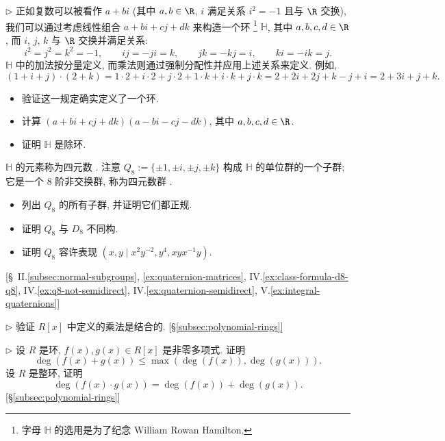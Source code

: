 \begin{prob}
\label{ex:quaternions}
$\triangleright$ 正如复数可以被看作 $a + bi$ (其中 $a, b \in \R$, $i$ 满足关系 $i^2 = -1$ 且与 $\R$ 交换), 我们可以通过考虑线性组合 $a + bi + cj + dk$ 来构造一个环%
\footnote{字母 $\mathbb{H}$ 的选用是为了纪念 William Rowan Hamilton.}%
$\mathbb{H}$, 其中 $a, b, c, d \in \R$, 而 $i$, $j$, $k$ 与 $\R$ 交换并满足关系:
\[
i^2 = j^2 = k^2 = -1, \qquad ij = -ji = k, \qquad jk = -kj = i, \qquad ki = -ik = j.
\]
$\mathbb{H}$ 中的加法按分量定义, 而乘法则通过强制分配性并应用上述关系来定义. 例如,
\[
(1 + i + j) \cdot (2 + k) = 1 \cdot 2 + i \cdot 2 + j \cdot 2 + 1 \cdot k + i \cdot k + j \cdot k = 2 + 2i + 2j + k - j + i = 2 + 3i + j + k.
\]
\begin{itemize}
	\item[(i)] 验证这一规定确实定义了一个环.
	\item[(ii)] 计算 $(a + bi + cj + dk)(a - bi - cj - dk)$, 其中 $a, b, c, d \in \R$.
	\item[(iii)] 证明 $\mathbb{H}$ 是除环.
\end{itemize}
$\mathbb{H}$ 的元素称为四元数%
. 注意 $Q_8 := \{\pm 1, \pm i, \pm j, \pm k\}$ 构成 $\mathbb{H}$ 的单位群的一个子群; 它是一个 $8$ 阶非交换群, 称为四元数群%
.
\begin{itemize}
	\item[(iv)] 列出 $Q_8$ 的所有子群, 并证明它们都正规.
	\item[(v)] 证明 $Q_8$ 与 $D_8$ 不同构.
	\item[(vi)] 证明 $Q_8$ 容许表现 $(x, y \mid x^2 y^{-2}, y^4, xyx^{-1}y)$.
\end{itemize}
[\S~II.\ref{subsec:normal-subgroups}, \ref{ex:quaternion-matrices}, IV.\ref{ex:class-formula-d8-q8}, IV.\ref{ex:q8-not-semidirect}, IV.\ref{ex:quaternion-semidirect}, V.\ref{ex:integral-quaternions}]
\end{prob}

\begin{prob}
\label{ex:poly-assoc}
$\triangleright$ 验证 $R[x]$ 中定义的乘法是结合的. [\S\ref{subsec:polynomial-rings}]
\end{prob}

\begin{prob}
\label{ex:degree-domain}
$\triangleright$ 设 $R$ 是环, $f(x), g(x) \in R[x]$ 是非零多项式. 证明
\[
\deg(f(x) + g(x)) \leq \max(\deg(f(x)), \deg(g(x))).
\]
设 $R$ 是整环, 证明
\[
\deg(f(x) \cdot g(x)) = \deg(f(x)) + \deg(g(x)).
\]
[\S\ref{subsec:polynomial-rings}]
\end{prob}

